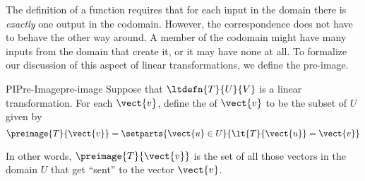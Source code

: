 %
%
%
The definition of a function requires that for each input in the domain there is {\em exactly} one output in the codomain.  However, the correspondence does not have to behave the other way around.  A member of the codomain might have many inputs from the domain that create it, or it may have none at all.  To formalize our discussion of this aspect of linear transformations, we define the pre-image.
%
\begin{definition}{PI}{Pre-Image}{pre-image}
Suppose that $\ltdefn{T}{U}{V}$ is a linear transformation.  For each $\vect{v}$, define the  of $\vect{v}$ to be the subset of $U$ given by
%
\begin{equation*}
\preimage{T}{\vect{v}}=\setparts{\vect{u}\in U}{\lt{T}{\vect{u}}=\vect{v}}
\end{equation*}
%
\end{definition}
%
In other words, $\preimage{T}{\vect{v}}$ is the set of all those vectors in the domain $U$ that get ``sent'' to the vector $\vect{v}$.\par
%
%
%
